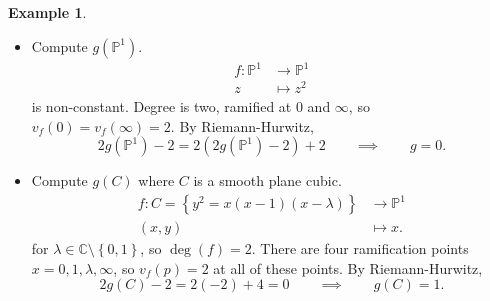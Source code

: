 \documentclass{article}
\newcommand{\C}{\mathbb{C}}
\renewcommand{\P}{\mathbb{P}}
\newcommand{\rb}[1]{\left( #1 \right)}
\newcommand{\cb}[1]{\left\{ #1 \right\}}
\theoremstyle{definition}\newtheorem{definition}{Definition}[section]
\theoremstyle{definition}\newtheorem{notation}[definition]{Notation}
\theoremstyle{definition}\newtheorem{remark}[definition]{Remark}
\theoremstyle{definition}\newtheorem{example1}[definition]{Example}
\theoremstyle{definition}\newtheorem{fact}{Fact}
\theoremstyle{definition}\newtheorem{exercise}{Exercise}
\theoremstyle{definition}\newtheorem*{example2}{Example}
\begin{document}
\begin{example2}
\hfill
\begin{itemize}
\item Compute $ g\rb{\P^1} $.
\begin{align*}
f : \P^1 & \to \P^1 \\
z & \mapsto z^2
\end{align*}
is non-constant. Degree is two, ramified at $ 0 $ and $ \infty $, so $ v_f\rb{0} = v_f\rb{\infty} = 2 $. By Riemann-Hurwitz,
$$ 2g\rb{\P^1} - 2 = 2\rb{2g\rb{\P^1} - 2} + 2 \qquad \implies \qquad g = 0. $$
\item Compute $ g\rb{C} $ where $ C $ is a smooth plane cubic.
\begin{align*}
f : C = \cb{y^2 = x\rb{x - 1}\rb{x - \lambda}} & \to \P^1 \\
\rb{x, y} & \mapsto x.
\end{align*}
for $ \lambda \in \C \setminus \cb{0, 1} $, so $ \deg\rb{f} = 2 $. There are four ramification points $ x = 0, 1, \lambda, \infty $, so $ v_f\rb{p} = 2 $ at all of these points. By Riemann-Hurwitz,
$$ 2g\rb{C} - 2 = 2\rb{-2} + 4 = 0 \qquad \implies \qquad g\rb{C} = 1. $$
\end{itemize}
\end{example2}
\end{document}
